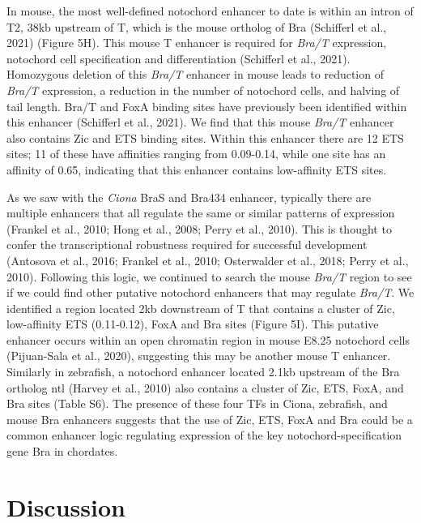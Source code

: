 In mouse, the most well-defined notochord enhancer to date is within an intron of T2, 38kb upstream of T, which is the mouse ortholog of Bra (Schifferl et al., 2021) (Figure 5H). This mouse T enhancer is required for \textit{Bra/T} expression, notochord cell specification and differentiation (Schifferl et al., 2021). Homozygous deletion of this \textit{Bra/T} enhancer in mouse leads to reduction of \textit{Bra/T} expression, a reduction in the number of notochord cells, and halving of tail length. Bra/T and FoxA binding sites have previously been identified within this enhancer (Schifferl et al., 2021). We find that this mouse \textit{Bra/T} enhancer also contains Zic and ETS binding sites. Within this enhancer there are 12 ETS sites; 11 of these have affinities ranging from 0.09-0.14, while one site has an affinity of 0.65, indicating that this enhancer contains low-affinity ETS sites. 

As we saw with the \textit{Ciona} BraS and Bra434 enhancer, typically there are multiple enhancers that all regulate the same or similar patterns of expression (Frankel et al., 2010; Hong et al., 2008; Perry et al., 2010). This is thought to confer the transcriptional robustness required for successful development (Antosova et al., 2016; Frankel et al., 2010; Osterwalder et al., 2018; Perry et al., 2010). Following this logic, we continued to search the mouse \textit{Bra/T} region to see if we could find other putative notochord enhancers that may regulate \textit{Bra/T}. We identified a region located 2kb downstream of T that contains a cluster of Zic, low-affinity ETS (0.11-0.12), FoxA and Bra sites (Figure 5I). This putative enhancer occurs within an open chromatin region in mouse E8.25 notochord cells (Pijuan-Sala et al., 2020), suggesting this may be another mouse T enhancer. Similarly in zebrafish, a notochord enhancer located 2.1kb upstream of the Bra ortholog ntl (Harvey et al., 2010) also contains a cluster of Zic, ETS, FoxA, and Bra sites (Table S6). The presence of these four TFs in Ciona, zebrafish, and mouse Bra enhancers suggests that the use of Zic, ETS, FoxA and Bra could be a common enhancer logic regulating expression of the key notochord-specification gene Bra in chordates.

\section{Discussion}

